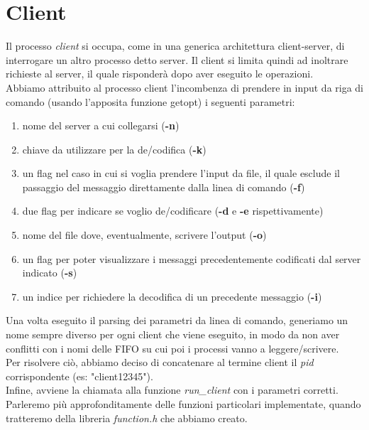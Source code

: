 \documentclass[a4paper,9pt]{article}
\begin{document}
\section{Client}
Il processo \emph{client} si occupa, come in una generica architettura client-server, di interrogare un altro processo detto server. Il client si limita quindi ad inoltrare richieste al server, il quale risponderà dopo aver eseguito le operazioni.\\
Abbiamo attribuito al processo client l'incombenza di prendere in input da riga di comando (usando l'apposita funzione getopt) i seguenti parametri:
\begin{enumerate}
\item nome del server a cui collegarsi (\textbf{-n})
\item chiave da utilizzare per la de/codifica (\textbf{-k})
\item un flag nel caso in cui si voglia prendere l'input da file, il quale esclude il passaggio del messaggio direttamente dalla linea di comando (\textbf{-f})
\item due flag per indicare se voglio de/codificare (\textbf{-d} e \textbf{-e} rispettivamente)
\item nome del file dove, eventualmente, scrivere l'output (\textbf{-o})
\item un flag per poter visualizzare i messaggi precedentemente codificati dal server indicato (\textbf{-s})
\item un indice per richiedere la decodifica di un precedente messaggio (\textbf{-i})
\end{enumerate}
Una volta eseguito il parsing dei parametri da linea di comando, generiamo un nome sempre diverso per ogni client che viene eseguito, in modo da non aver conflitti con i nomi delle FIFO su cui poi i processi vanno a leggere/scrivere.\\
Per risolvere ciò, abbiamo deciso di concatenare al termine client il \emph{pid} corrispondente (es: "client12345").\\
Infine, avviene la chiamata alla funzione \emph{run\_client} con i parametri corretti. Parleremo più approfonditamente delle funzioni particolari implementate, quando tratteremo della libreria \emph{function.h} che abbiamo creato.
\end{document}
